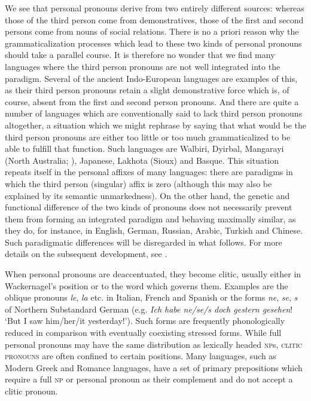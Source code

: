 \label{page43}We see that personal pronouns derive from two entirely different sources: whereas those of the third person come from demonstratives, those of the first and second persons come from nouns of social relations. There is no a priori reason why the grammaticalization processes which lead to these two kinds of personal pronouns should take a parallel course. It is therefore no wonder that we find many languages where the third person pronouns are not well integrated into the paradigm. Several of the ancient Indo-European languages are examples of this, as their third person pronouns retain a slight demonstrative force which is, of course, absent from the first and second person pronouns. And there are quite a number of languages which are conventionally said to lack third person pronouns altogether, a situation which we might rephrase by saying that what would be the third person pronouns are either too little or too much grammaticalized to be able to fulfill that function. Such languages are Walbiri, Dyirbal, Mangarayi (North Australia; \citealt[99]{Merlan1982}), Japanese, Lakhota (Sioux) and Basque. This situation repeats itself in the personal affixes of many languages: there are paradigms in which the third person (singular) affix is zero (although this may also be explained by its semantic unmarkedness). On the other hand, the genetic and functional difference of the two kinds of pronouns does not necessarily prevent them from forming an integrated paradigm and behaving maximally similar, as they do, for instance, in English, German, Russian, Arabic, Turkish and Chinese. Such paradigmatic differences will be disregarded in what follows. For more details on the subsequent development, see \citealt[§§~6.2 and 7.1]{Lehmann1982b}.

When personal pronouns are deaccentuated, they become clitic, usually either in Wackernagel's position or to the word which governs them. Examples are the oblique pronouns \textit{le}, \textit{la} etc. in Italian, French and Spanish or the forms \textit{ne}, \textit{se}, \textit{s} of Northern Substandard%
German (e.g. \textit{Ich habe ne/se/s doch gestern gesehen}! ‘But I saw him/her/it yesterday!’). Such forms are frequently phonologically reduced in comparison with eventually coexisting stressed forms.\label{page44b} While full personal pronouns may have the same distribution as lexically headed \textsc{np}s, \textsc{clitic pronouns} are often confined to certain positions. Many languages, such as Modern Greek and Romance languages, have a set of primary prepositions which require a full \textsc{np} or personal pronoun as their complement and do not accept a clitic pronoun.

